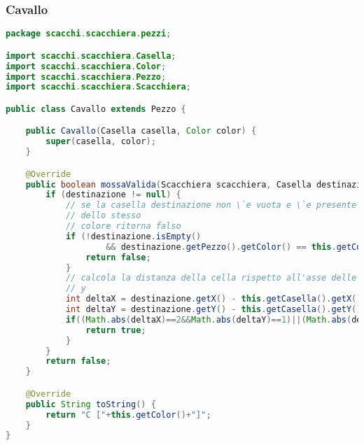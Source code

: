 \documentclass{article}
\begin{document}
\subsubsection{Cavallo}
\begin{lstlisting}[language=Java,escapechar=|]
package scacchi.scacchiera.pezzi;

import scacchi.scacchiera.Casella;
import scacchi.scacchiera.Color;
import scacchi.scacchiera.Pezzo;
import scacchi.scacchiera.Scacchiera;

public class Cavallo extends Pezzo {

	public Cavallo(Casella casella, Color color) {
		super(casella, color);
	}

	@Override
	public boolean mossaValida(Scacchiera scacchiera, Casella destinazione) {
		if (destinazione != null) {
			// se la casella destinazione non \`e vuota e \`e presente un Pezzo
			// dello stesso
			// colore ritorna falso
			if (!destinazione.isEmpty()
					&& destinazione.getPezzo().getColor() == this.getColor()) {
				return false;
			}
			// calcola la distanza della cella rispetto all'asse delle x e delle
			// y
			int deltaX = destinazione.getX() - this.getCasella().getX();
			int deltaY = destinazione.getY() - this.getCasella().getY();
			if((Math.abs(deltaX)==2&&Math.abs(deltaY)==1)||(Math.abs(deltaY)==2&&Math.abs(deltaX)==1)){
				return true;
			}
		}
		return false;
	}

	@Override
	public String toString() {
		return "C ["+this.getColor()+"]";
	}
}
\end{lstlisting}
\end{document}
